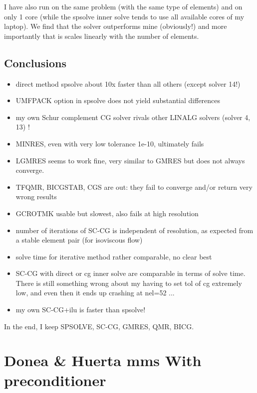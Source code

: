 I have also run \aspect on the same problem (with the same type of elements) and on only 
1 core (while the spsolve inner solve tends to use all available cores of my laptop). 
We find that the solver outperforms mine (obviously!) and more importantly that 
is scales linearly with the number of elements.

\subsection*{Conclusions}

\begin{itemize}
\item direct method spsolve about 10x faster than all others (except solver 14!)
\item UMFPACK option in spsolve does not yield substantial differences
\item my own Schur complement CG solver rivals other LINALG solvers (solver 4, 13) ! 
\item MINRES, even with very low tolerance 1e-10, ultimately fails
\item LGMRES seems to work fine, very similar to GMRES but does not always converge.
\item TFQMR, BICGSTAB, CGS are out: they fail to converge and/or return 
very wrong results
\item GCROTMK usable but slowest, also fails at high resolution 
\item number of iterations of SC-CG is independent of resolution, as expected
from a stable element pair (for isoviscous flow)
\item solve time for iterative method rather comparable, no clear best
\item SC-CG with direct or cg inner solve are comparable in terms of 
solve time. There is still something wrong about my having to 
set tol of cg extremely low, and even then it ends up crashing at nel=52 ...
\item my own SC-CG+ilu is faster than spsolve!
\end{itemize}

In the end, I keep SPSOLVE, SC-CG, GMRES, QMR, BICG.

\newpage
\section*{Donea \& Huerta mms With preconditioner}

